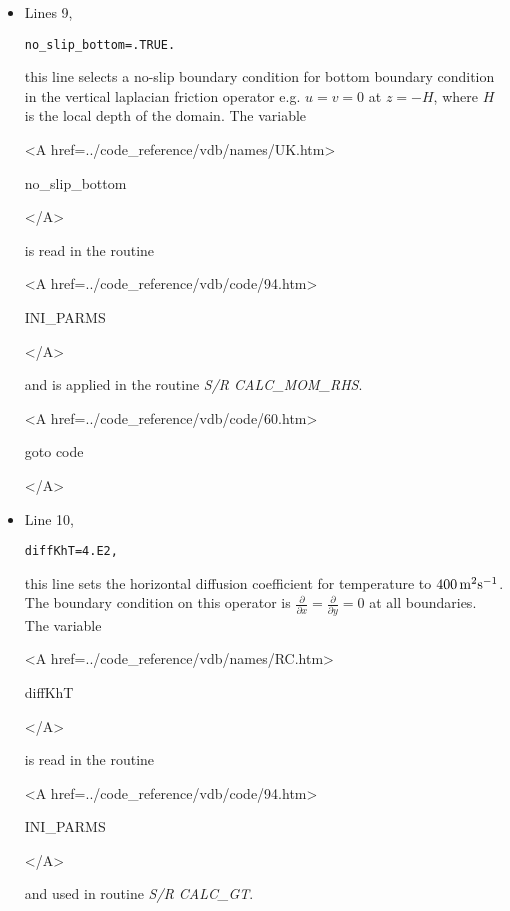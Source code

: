\begin{itemize}
\item Lines 9,
\begin{verbatim}
no_slip_bottom=.TRUE.
\end{verbatim}
this line selects a no-slip boundary condition for bottom
boundary condition in the vertical laplacian friction operator 
e.g. $u=v=0$ at $z=-H$, where $H$ is the local depth of the domain.
The variable
{\bf
\begin{rawhtml} <A href=../code_reference/vdb/names/UK.htm> \end{rawhtml}
no\_slip\_bottom
\begin{rawhtml} </A>\end{rawhtml}
}
is read in the routine
{\it
\begin{rawhtml} <A href=../code_reference/vdb/code/94.htm> \end{rawhtml}
INI\_PARMS
\begin{rawhtml} </A>\end{rawhtml}
} and is applied in the routine {\it S/R CALC\_MOM\_RHS}.

{\bf
\begin{rawhtml} <A href=../code_reference/vdb/code/60.htm> \end{rawhtml}
goto code
\begin{rawhtml} </A>\end{rawhtml}
}

\item Line 10,
\begin{verbatim}
diffKhT=4.E2,
\end{verbatim}
this line sets the horizontal diffusion coefficient for temperature
to $400\,{\rm m^{2}s^{-1}}$. The boundary condition on this
operator is $\frac{\partial}{\partial x}=\frac{\partial}{\partial y}=0$ at
all boundaries.
The variable
{\bf
\begin{rawhtml} <A href=../code_reference/vdb/names/RC.htm> \end{rawhtml}
diffKhT
\begin{rawhtml} </A>\end{rawhtml}
}
is read in the routine
{\it
\begin{rawhtml} <A href=../code_reference/vdb/code/94.htm> \end{rawhtml}
INI\_PARMS
\begin{rawhtml} </A>\end{rawhtml}
} and used in routine {\it S/R CALC\_GT}.


\end{itemize}
